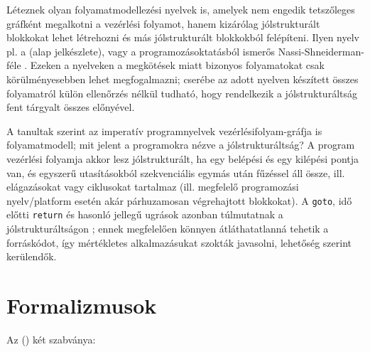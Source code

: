 Léteznek olyan folyamatmodellezési nyelvek is, amelyek nem engedik tetszőleges gráfként megalkotni a vezérlési folyamot, hanem kizárólag jólstrukturált blokkokat lehet létrehozni és más jólstrukturált blokkokból felépíteni. Ilyen nyelv pl. a  (alap jelkészlete), vagy a programozásoktatásból ismerős Nassi-Shneiderman-féle . Ezeken a nyelveken a megkötések miatt bizonyos folyamatokat csak körülményesebben lehet megfogalmazni; cserébe az adott nyelven készített összes folyamatról külön ellenőrzés nélkül tudható, hogy rendelkezik a jólstrukturáltság fent tárgyalt összes előnyével.

A tanultak szerint az imperatív programnyelvek vezérlésifolyam-gráfja is folyamatmodell; mit jelent a programokra nézve a jólstrukturáltság? A program vezérlési folyamja akkor lesz jólstrukturált, ha egy belépési és egy kilépési pontja van, és egyszerű utasításokból szekvenciális egymás után fűzéssel áll össze, ill. elágazásokat vagy ciklusokat tartalmaz (ill. megfelelő programozási nyelv/platform esetén akár párhuzamosan végrehajtott blokkokat). A \lstinline{goto}, idő előtti \lstinline{return} és hasonló jellegű ugrások azonban túlmutatnak a jólstrukturáltságon ; ennek megfelelően könnyen átláthatatlanná tehetik a forráskódot, így mértékletes alkalmazásukat szokták javasolni, lehetőség szerint kerülendők.

% 
% 

% 
% 
% 
% 
% 
% 


\section{Formalizmusok}

Az  () két szabványa:

